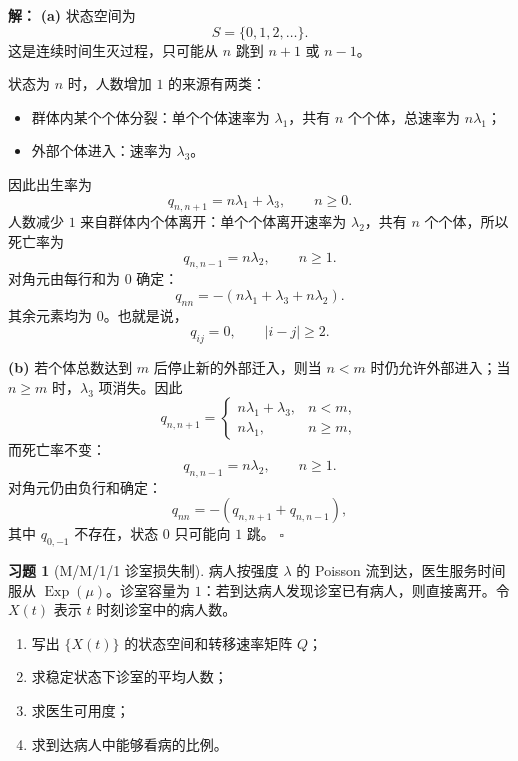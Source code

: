 \documentclass[12pt,a4paper,openany]{ctexrep}
\theoremstyle{definition}
\newtheorem{exercise}{习题}[section]
\newenvironment{solution}{\par\noindent\textbf{解：}}{\hfill$\square$\par}
\newcommand{\Exp}{\operatorname{Exp}}
\begin{document}
\begin{solution}
\textbf{(a)} 状态空间为
\[
S=\{0,1,2,\dots\}.
\]
这是连续时间生灭过程，只可能从 $n$ 跳到 $n+1$ 或 $n-1$。

状态为 $n$ 时，人数增加 $1$ 的来源有两类：
\begin{itemize}
	\item 群体内某个个体分裂：单个个体速率为 $\lambda_1$，共有 $n$ 个个体，总速率为 $n\lambda_1$；
	\item 外部个体进入：速率为 $\lambda_3$。
\end{itemize}
因此出生率为
\[
q_{n,n+1}=n\lambda_1+\lambda_3,\qquad n\ge0.
\]
人数减少 $1$ 来自群体内个体离开：单个个体离开速率为 $\lambda_2$，共有 $n$ 个个体，所以死亡率为
\[
q_{n,n-1}=n\lambda_2,\qquad n\ge1.
\]
对角元由每行和为 $0$ 确定：
\[
q_{nn}=-(n\lambda_1+\lambda_3+n\lambda_2).
\]
其余元素均为 $0$。也就是说，
\[
q_{ij}=0,\qquad |i-j|\ge2.
\]

\textbf{(b)} 若个体总数达到 $m$ 后停止新的外部迁入，则当 $n<m$ 时仍允许外部进入；当 $n\ge m$ 时，$\lambda_3$ 项消失。因此
\[
q_{n,n+1}=
\begin{cases}
n\lambda_1+\lambda_3,&n<m,\\
n\lambda_1,&n\ge m,
\end{cases}
\]
而死亡率不变：
\[
q_{n,n-1}=n\lambda_2,\qquad n\ge1.
\]
对角元仍由负行和确定：
\[
q_{nn}=-(q_{n,n+1}+q_{n,n-1}),
\]
其中 $q_{0,-1}$ 不存在，状态 $0$ 只可能向 $1$ 跳。
\end{solution}

\begin{exercise}[M/M/1/1 诊室损失制]
病人按强度 $\lambda$ 的 Poisson 流到达，医生服务时间服从 $\Exp(\mu)$。诊室容量为 $1$：若到达病人发现诊室已有病人，则直接离开。令 $X(t)$ 表示 $t$ 时刻诊室中的病人数。
\begin{enumerate}[label=(\alph*)]
	\item 写出 $\{X(t)\}$ 的状态空间和转移速率矩阵 $Q$；
	\item 求稳定状态下诊室的平均人数；
	\item 求医生可用度；
	\item 求到达病人中能够看病的比例。
\end{enumerate}
\end{exercise}
\end{document}
